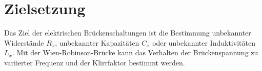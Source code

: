 \section{Zielsetzung}
Das Ziel der elektrischen Brückenschaltungen ist die Bestimmung unbekannter Widerstände $R_x$, 
unbekannter Kapazitäten $C_x$ oder unbekannter Induktivitäten $L_x$.
Mit der Wien-Robinson-Brücke kann das Verhalten der Brückenspannung
zu variierter Frequenz und der Klirrfaktor bestimmt werden.